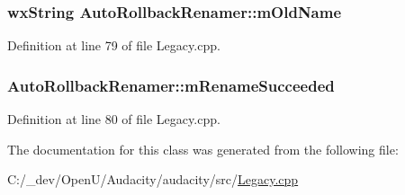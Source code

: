 \subsubsection[{\texorpdfstring{m\+Old\+Name}{mOldName}}]{\setlength{\rightskip}{0pt plus 5cm}wx\+String Auto\+Rollback\+Renamer\+::m\+Old\+Name}\hypertarget{class_auto_rollback_renamer_a59d9d4f405559ec61ae6cb9f2cd79fa1}{}\label{class_auto_rollback_renamer_a59d9d4f405559ec61ae6cb9f2cd79fa1}


Definition at line 79 of file Legacy.\+cpp.

\subsubsection[{\texorpdfstring{m\+Rename\+Succeeded}{mRenameSucceeded}}]{ Auto\+Rollback\+Renamer\+::m\+Rename\+Succeeded}\hypertarget{class_auto_rollback_renamer_a52144544ccb22ec75e664dd88e5e4120}{}\label{class_auto_rollback_renamer_a52144544ccb22ec75e664dd88e5e4120}


Definition at line 80 of file Legacy.\+cpp.



The documentation for this class was generated from the following file\+:\begin{DoxyCompactItemize}
\item 
C\+:/\+\_\+dev/\+Open\+U/\+Audacity/audacity/src/\hyperlink{_legacy_8cpp}{Legacy.\+cpp}\end{DoxyCompactItemize}
